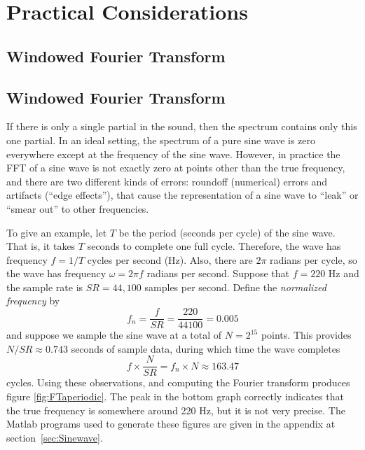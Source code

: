 \section{Practical Considerations}
\label{sec:practical}
{\subsection{Windowed Fourier Transform}}
{\subsection{Windowed Fourier Transform\protect\footnotemark}
}
If there is only a single partial in the sound, then the spectrum
contains only this one partial.  In an ideal setting, the spectrum of
a pure sine wave is zero everywhere except at the frequency of the
sine wave.  However, in practice the FFT of a sine wave is not exactly
zero at points other than the true frequency, and there are two
different kinds of errors: roundoff  (numerical) errors and artifacts
(``edge effects''), that cause the representation of a sine wave to
``leak'' or ``smear out'' to other frequencies.

To give an example, let $T$ be the period (seconds per cycle) of the
sine wave. That is, it takes $T$ seconds to complete one full
cycle. Therefore, the wave has frequency $f=1/T$ cycles per second 
(Hz). Also, there are $2\pi$ radians per cycle, so the wave 
has frequency $\omega = 2\pi f$ radians per second.
Suppose that $f=220$ Hz and the sample rate is $SR=44,\!100$ samples per
second.  Define the \emph{normalized frequency} by
\[
 f_n = \frac{f}{SR}= \frac{220}{44100} = 0.005
\]
and suppose we sample the sine wave at a total of $N=2^{15}$
points.  This provides $N/SR \approx 0.743$ seconds of sample data,
during which time the wave completes 
\[
   f \times \frac{N}{SR}  =  f_n \times N \approx 163.47 
\]
cycles.  Using these observations, and computing the Fourier transform
produces figure \ref{fig:FTaperiodic}.
The peak in the bottom graph correctly indicates that the true
frequency is somewhere around 220 Hz, but it is not very precise.  
The Matlab programs used to generate these figures are given in the
appendix at section~\ref{sec:Sinewave}. 

